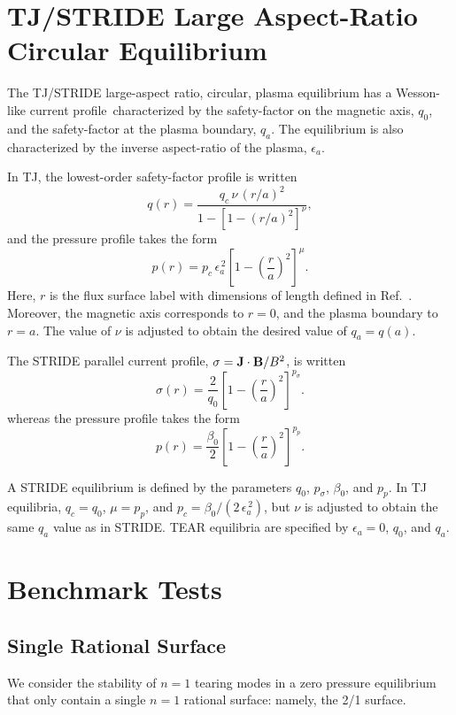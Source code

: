 \documentclass[12pt,prb,aps,notitlepage]{revtex4-1}
\begin{document}
\section{TJ/STRIDE  Large Aspect-Ratio Circular Equilibrium}
The TJ/STRIDE large-aspect ratio, circular,  plasma equilibrium  has a Wesson-like current profile\,\cite{wesson} characterized by the
safety-factor on the magnetic axis, $q_0$, and the safety-factor at the plasma boundary, $q_a$.  The equilibrium is also characterized by the inverse aspect-ratio of the plasma, $\epsilon_a$. 

In TJ, the lowest-order safety-factor profile is written
\begin{equation}
q(r) = \frac{q_c\,\nu\,(r/a)^2}{1-[1-(r/a)^2]^\nu},
\end{equation}
and the pressure profile takes the form
\begin{equation}
p(r) = p_c\,\epsilon_a^{\,2}\left[1-\left(\frac{r}{a}\right)^2\right]^{\mu}.
\end{equation}
Here, $r$ is the flux surface label with dimensions of length defined in Ref.~. Moreover, the magnetic axis corresponds to $r=0$, and the plasma
boundary to $r=a$. 
The value of $\nu$ is adjusted to obtain the desired value of $q_a=q(a)$. 

The STRIDE
 parallel current profile, $\sigma={\bf J}\cdot{\bf B}/B^2$,  is written
\begin{equation}
\sigma(r) = \frac{2}{q_0}\left[1-\left(\frac{r}{a}\right)^2\right]^{p_\sigma}.
\end{equation}
whereas the  pressure profile takes the form
\begin{equation}
p(r)= \frac{\beta_0}{2}\left[1-\left(\frac{r}{a}\right)^2\right]^{p_p}.
\end{equation}

A STRIDE equilibrium is defined by the parameters $q_0$, $p_\sigma$, $\beta_0$, and $p_p$. In TJ equilibria,
$q_c=q_0$, $\mu=p_p$, and $p_c= \beta_0/(2\,\epsilon_a^{\,2})$, but $\nu$ is adjusted to obtain the same $q_a$ value as in STRIDE. 
TEAR equilibria are specified by $\epsilon_a=0$, $q_0$, and $q_a$. 

\section{Benchmark Tests}
\subsection{Single Rational Surface}
We consider the stability of $n=1$ tearing modes 
in a zero pressure equilibrium that only contain a single $n=1$ rational surface: namely, the 2/1 surface. 
\end{document}
